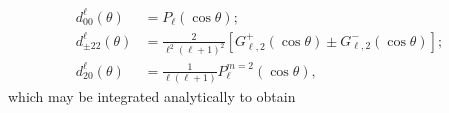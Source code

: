 \begin{align}
d_{00}^\ell \left( \theta \right)
&= P_\ell \left( \cos \theta \right);
\\
d_{\pm 2 2}^\ell \left( \theta \right)
&= \frac{2}{\ell^2 \left( \ell + 1 \right)^2}
\left[ G_{\ell, 2}^+ \left( \cos \theta \right)
\pm G_{\ell, 2}^- \left( \cos \theta \right) \right];
\\
%
d_{2 0}^\ell \left( \theta \right)
&= \frac{1}{\ell \left( \ell + 1 \right)}
P_\ell^{m = 2} \left( \cos \theta \right),
\end{align}
which may be integrated analytically to obtain \citep{Friedrich2021, Fang2020b}
